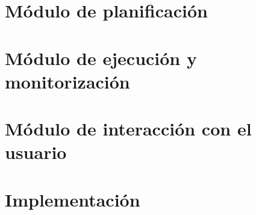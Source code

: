 \documentclass[11pt]{beamer}    %
\begin{document}
    \section{Módulo de planificación}

    \section{Módulo de ejecución y monitorización}

    \section{Módulo de interacción con el usuario}

    \section{Implementación}
\end{document}
